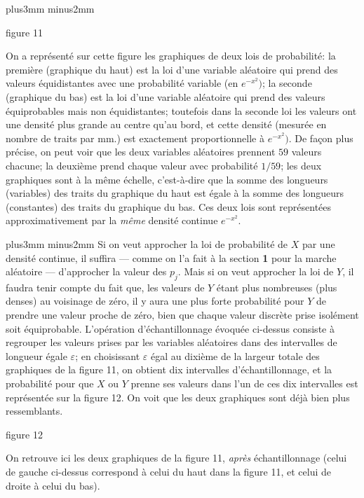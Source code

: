 \midinsert
\centerline{}
\vskip3mm
plus3mm minus2mm
\centerline{\eightpoint figure 11}
\vskip6pt
\centerline{\vbox{\hsize=12cm \eightpoint  On a repr\'esent\'e sur cette
figure les graphiques de deux lois de probabilit\'e: la premi\`ere (graphique
du haut) est la loi d'une variable al\'eatoire qui prend des valeurs
\'equidistantes avec une probabilit\'e variable (en $e^{-x^2})$; la seconde
(graphique du bas) est la loi d'une variable al\'eatoire qui prend des valeurs
\'equiprobables mais non \'equidistantes; toutefois dans la seconde loi les
valeurs ont une densit\'e plus grande au centre qu'au bord, et cette 
densit\'e (mesur\'ee en nombre de traits par mm.) est exactement
proportionnelle \`a $e^{-x^2})$. De fa\c{c}on plus pr\'ecise, on peut voir que
les deux variables al\'eatoires prennent $59$ valeurs chacune; la
deuxi\`eme prend chaque valeur avec probabilit\'e $1/59$; les deux
graphiques sont \`a la m\^eme \'echelle, c'est-\`a-dire que la somme des
longueurs (variables) des traits du graphique du haut est \'egale \`a la
somme des longueurs (constantes) des traits du graphique du bas.
\smallskip
Ces deux lois sont repr\'esent\'ees approximativement par la {\it m\^eme}
densit\'e continue $e^{-x^2}$.}}  
\vskip3mm
plus3mm minus2mm
\endinsert
\medskip
Si on veut approcher la loi de probabilit\'e de $X$ par une densit\'e 
continue,  il suffira --- comme on l'a fait \`a la section {\bf 1} pour la
marche
al\'eatoire --- d'approcher la valeur des $p_j$. Mais si on veut
approcher la loi de $Y$,  il faudra tenir compte du fait que,  les valeurs
de $Y$ \'etant
plus nombreuses (plus denses) au voisinage de z\'ero, 
il y aura une plus
forte probabilit\'e pour $Y$ de prendre une valeur
proche de z\'ero,  bien que chaque valeur discr\`ete prise isol\'ement
soit \'equiprobable.
 L'op\'eration d'\'echantillonnage \'evoqu\'ee
ci-dessus consiste \`a
regrouper les valeurs prises par les variables
al\'eatoires dans des
intervalles de longueur \'egale $\varepsilon$; 
en choisissant $\varepsilon$ \'egal au dixi\`eme de la largeur totale
des graphiques de la
figure 11,  on obtient dix intervalles
d'\'echantillonnage,  et la probabilit\'e
pour que $X$ ou $Y$ prenne
ses valeurs dans l'un de ces dix intervalles est
repr\'esent\'ee sur
la figure 12.  On voit que les deux graphiques sont
d\'ej\`a bien plus
ressemblants.

\midinsert
\centerline{}
\vskip3mm
\centerline{\eightpoint figure 12}
\vskip6pt
\centerline{\vbox{\hsize=12cm \eightpoint  On retrouve ici les deux
graphiques de la figure 11, {\it apr\`es} \'echantillonnage (celui de gauche
ci-dessus correspond \`a celui du haut dans la figure 11, et celui de
droite \`a celui du bas).}}   
\vskip3mm 
\endinsert

